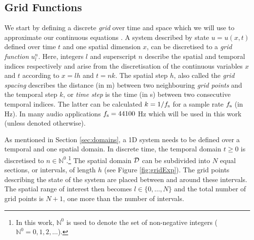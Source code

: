\subsection{Grid Functions } \label{sec:gridFunctions}
We start by defining a discrete \textit{grid} over time and space which we will use to approximate our continuous equations . A system described by state $u = u(x,t)$ defined over time $t$ and one spatial dimension $x$, can be discretised to a \textit{grid function} $u_l^n$. Here, integers $l$ and superscript $n$ describe the spatial and temporal indices respectively and arise from the discretisation of the continuous variables $x$ and $t$ according to $x=lh$ and $t=nk$. The spatial step $h$, also called the \textit{grid spacing} describes the distance (in m) between two neighbouring \textit{grid points} and the temporal step $k$, or \textit{time step} is the time (in s) between two consecutive temporal indices. The latter can be calculated $k=1/f_\text{s}$ for a sample rate $f_\text{s}$ (in Hz). In many audio applications $f_\text{s} = 44100$ Hz which will be used in this work (unless denoted otherwise).

As mentioned in Section \ref{sec:domains}, a 1D system needs to be defined over a temporal and one spatial domain.
In discrete time, the temporal domain $t \geq 0$ is discretised to $n \in \mathbb{N}^0$.\footnote{In this work, $\mathbb{N}^0$ is used to denote the set of non-negative integers ($\mathbb{N}^0 = 0, 1, 2, 
\hdots$).} 
The spatial domain $\mathcal{D}$ can be subdivided into $N$ equal sections, or intervals, of length $h$ (see Figure \ref{fig:gridExp}). The grid points describing the state of the system are placed between and around these intervals. The spatial range of interest then becomes $l\in \{0, \hdots, N\}$ and the total number of grid points is $N+1$, one more than the number of intervals. 





